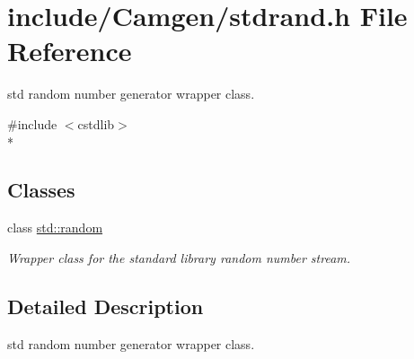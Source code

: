 \hypertarget{a00791}{}\section{include/\+Camgen/stdrand.h File Reference}
\label{a00791}


std random number generator wrapper class.  


{\ttfamily \#include $<$cstdlib$>$}\\*
\subsection*{Classes}
\begin{DoxyCompactItemize}
\item 
class \hyperlink{a00470}{std\+::random}
\begin{DoxyCompactList}\small\item\em Wrapper class for the standard library random number stream. \end{DoxyCompactList}\end{DoxyCompactItemize}


\subsection{Detailed Description}
std random number generator wrapper class. 

